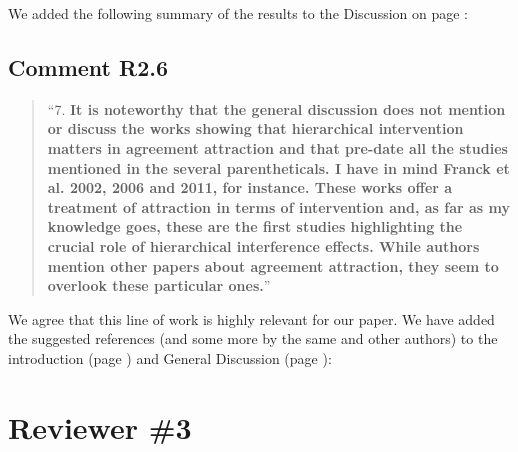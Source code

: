 \documentclass[12pt]{article}
\begin{document}
\begin{quote}
\end{quote}

\noindent We added the following summary of the results to the Discussion on page \pageref{ERP_discussion}:

\begin{quote}
\end{quote}

\subsection*{Comment R2.6}
\begin{quote}
``7. \textbf{It is noteworthy that the general discussion does not mention or discuss the works showing that hierarchical intervention matters in agreement attraction and that pre-date all the studies mentioned in the several parentheticals. I have in mind Franck et al. 2002, 2006 and 2011, for instance. These works offer a treatment of attraction in terms of intervention and, as far as my knowledge goes, these are the first studies highlighting the crucial role of hierarchical interference effects. While authors mention other papers about agreement attraction, they seem to overlook these particular ones.}''
\end{quote}

We agree that this line of work is highly relevant for our paper. We have added the suggested references (and some more by the same and other authors) to the introduction (page \pageref{franck_refs}) and General Discussion (page \pageref{future_work}):

\begin{quote}
\end{quote}

\begin{quote}
\end{quote}

\section*{Reviewer \#3} 
\end{document}
